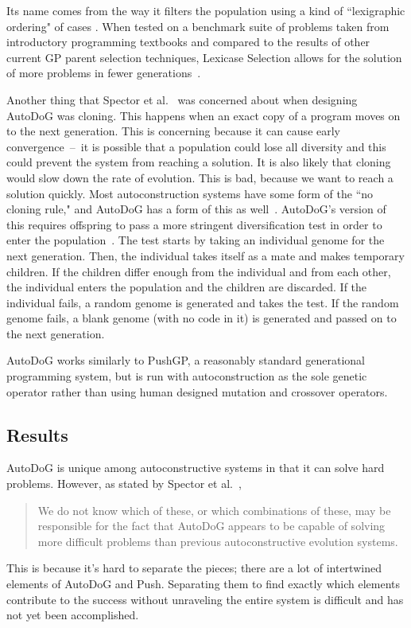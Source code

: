 \documentclass{sig-alternate}
\begin{document}
Its name comes from the way it filters the population using a kind of ``lexigraphic ordering" of cases \cite{spector:2016}. When tested on a benchmark suite of problems taken from introductory programming textbooks and compared to the results of other current GP parent selection techniques, Lexicase Selection allows for the solution of more problems in fewer generations~\cite{spector:2016}.

Another thing that Spector et al.~\cite{spector:2016} was concerned about when designing AutoDoG was cloning. This happens when an exact copy of a program moves on to the next generation. This is concerning because it can cause early convergence~--~it is possible that a population could lose all diversity and this could prevent the system from reaching a solution.
It is also likely that cloning would slow down the rate of evolution. This is bad, because we want to reach a solution quickly. Most autoconstruction systems have some form of the ``no cloning rule," and AutoDoG has a form of this as well~\cite{spector:2016}. AutoDoG's version of this requires offspring to pass a more stringent diversification test in order to enter the population~\cite{spector:2016}. The test starts by taking an individual genome for the next generation. Then, the individual takes itself as a mate and makes temporary children. If the children differ enough from the individual and from each other, the individual enters the population and the children are discarded. If the individual fails, a random genome is generated and takes the test. If the random genome fails, a blank genome (with no code in it) is generated and passed on to the next generation.

AutoDoG works similarly to PushGP, a reasonably standard generational programming system, but is run with autoconstruction as the sole genetic operator rather than using human designed mutation and crossover operators.

\subsection{Results}
\label{sec:results}
AutoDoG is unique among autoconstructive systems in that it can solve hard problems. However, as stated by Spector et al.~\cite{spector:2016},
\begin{quotation}
	We do not know which of these, or which combinations of these, may be responsible for the fact that AutoDoG appears to be capable of solving more difficult problems than previous autoconstructive evolution systems.
\end{quotation}
This is because it's hard to separate the pieces; there are a lot of intertwined elements of AutoDoG and Push. Separating them to find exactly which elements contribute to the success without unraveling the entire system is difficult and has not yet been accomplished.
\end{document}
